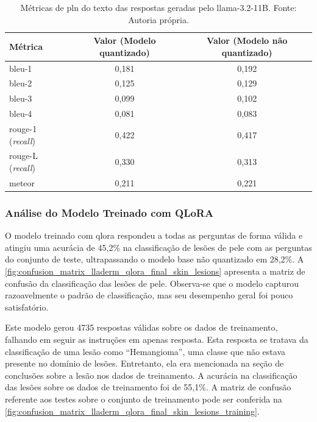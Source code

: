 \begin{table}[ht]
    \centering
    \begin{tabular}{l|c|c}
        \hline
        Métrica                        & Valor (Modelo quantizado) & Valor (Modelo não quantizado) \\ \hline
        \ac{bleu}-1                    & 0,181                     & 0,192                         \\
        \ac{bleu}-2                    & 0,125                     & 0,129                         \\
        \ac{bleu}-3                    & 0,099                     & 0,102                         \\
        \ac{bleu}-4                    & 0,081                     & 0,083                         \\ \hline
        \ac{rouge}-1 (\textit{recall}) & 0,422                     & 0,417                         \\
        \ac{rouge}-L (\textit{recall}) & 0,330                     & 0,313                         \\ \hline
        \ac{meteor}                    & 0,211                     & 0,221                         \\ \hline
    \end{tabular}
    \label{tab:llama_nlp_metrics}
    \caption{Métricas de \ac{pln} do texto das respostas geradas pelo \ac{llama}-3.2-11B. Fonte: Autoria própria.}
\end{table}

\subsubsection{Análise do Modelo Treinado com QLoRA}

O modelo treinado com \ac{qlora} respondeu a todas as perguntas de forma válida e atingiu uma acurácia de 45,2\% na
classificação de lesões de pele com as perguntas do conjunto de teste, ultrapassando o modelo base não quantizado
em 28,2\%. A \autoref{fig:confusion_matrix_lladerm_qlora_final_skin_lesions} apresenta a matriz de confusão da
classificação das lesões de pele. Observa-se que o modelo capturou razoavelmente o padrão de classificação, mas seu
desempenho geral foi pouco satisfatório.

Este modelo gerou 4735 respostas válidas sobre os dados de treinamento, falhando em seguir as instruções em apenas
resposta. Esta resposta se tratava da classificação de uma lesão como ``Hemangioma'', uma classe que não estava
presente no domínio de lesões. Entretanto, ela era mencionada na seção de conclusões sobre a lesão nos dados de
treinamento. A acurácia na classificação das lesões sobre os dados de treinamento foi de 55,1\%. A matriz de confusão
referente aos testes sobre o conjunto de treinamento pode ser conferida na
\autoref{fig:confusion_matrix_lladerm_qlora_final_skin_lesions_training}.

